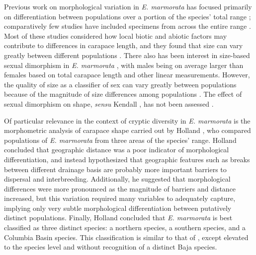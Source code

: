 \documentclass[10pt,letterpaper]{article}
\begin{document}
Previous work on morphological variation in \textit{E. marmorata} has focused primarily on differentiation between populations over a portion of the species' total range \cite{Lubcke2007,Germano2008,Germano2009,Bury2010}; comparatively few studies have included specimens from across the entire range \cite{Holland1992}. Most of these studies considered how local biotic and abiotic factors may contribute to differences in carapace length, and they found that size can vary greatly between different populations \cite{Lubcke2007,Germano2008,Germano2009}. There also has been interest in size-based sexual dimorphism in \textit{E. marmorata} \cite{Holland1992,Lubcke2007,Germano2009}, with males being on average larger than females based on total carapace length and other linear measurements. However, the quality of size as a classifier of sex can vary greatly between populations \cite{Holland1992} because of the magnitude of size differences among populations \cite{Lubcke2007,Germano2009}. The effect of sexual dimorphism on shape, \textit{sensu} Kendall \cite{Kendall1977a}, has not been assessed \cite{Holland1992,Lubcke2007,Germano2008}.

Of particular relevance in the context of cryptic diversity in \textit{E. marmorata} is the morphometric analysis of carapace shape carried out by Holland \cite{Holland1992}, who compared populations of \textit{E. marmorata} from three areas of the species' range. Holland concluded that geographic distance was a poor indicator of morphological differentiation, and instead hypothesized that geographic features such as breaks between different drainage basis are probably more important barriers to dispersal and interbreeding. Additionally, he suggested that morphological differences were more pronounced as the magnitude of barriers and distance increased, but this variation required many variables to adequately capture, implying only very subtle morphological differentiation between putatively distinct populations. Finally, Holland concluded that \textit{E. marmorata} is best classified as three distinct species: a northern species, a southern species, and a Columbia Basin species. This classification is similar to that of \cite{Seeliger1945}, except elevated to the species level and without recognition of a distinct Baja species. 
\end{document}
